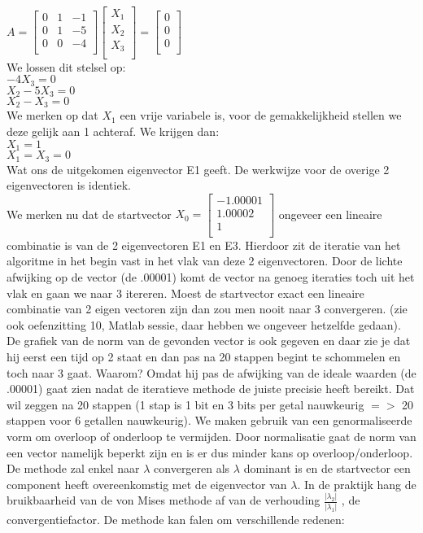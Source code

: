 $ A =\begin{bmatrix} 
 0 & 1 & -1 \\
 0 & 1 & -5 \\
 0 & 0 & -4\\
\end{bmatrix} \begin{bmatrix}
X_1 \\
X_2 \\
X_3 \\
\end{bmatrix} = \begin{bmatrix}
0 \\
0 \\
0 \\
\end{bmatrix} $ \\
We lossen dit stelsel op: \\
$-4X_3 = 0 $ \\
$X_2 - 5X_3 = 0 $ \\
$X_2 - X_3 = 0 $ \\
We merken op dat $X_1$ een vrije variabele is, voor de gemakkelijkheid stellen we deze gelijk aan 1 achteraf.
We krijgen dan: \\
$X_1 = 1 $ \\
$X_1 = X_3 = 0 $ \\
Wat ons de uitgekomen eigenvector E1 geeft. De werkwijze voor de overige 2 eigenvectoren is identiek. \\
We merken nu dat de startvector 
$ X_0 = \begin{bmatrix}
-1.00001 \\
1.00002 \\
1 \\
\end{bmatrix} $
ongeveer een lineaire combinatie is van de 2 eigenvectoren E1 en E3. Hierdoor zit de iteratie van het algoritme in het begin vast in het vlak van deze 2 eigenvectoren. Door de lichte afwijking op de vector (de .00001) komt de vector na genoeg iteraties toch uit het vlak en gaan we naar 3 itereren. Moest de startvector exact een lineaire combinatie van 2 eigen vectoren zijn dan zou men nooit naar 3 convergeren. (zie ook oefenzitting 10, Matlab sessie, daar hebben we ongeveer hetzelfde gedaan). De grafiek van de norm van de gevonden vector is ook gegeven en daar zie je dat hij eerst een tijd op 2 staat en dan pas na 20 stappen begint te schommelen en toch naar 3 gaat. Waarom? Omdat hij pas de afwijking van de ideale waarden (de .00001) gaat zien nadat de iteratieve methode de juiste precisie heeft bereikt. Dat wil zeggen na 20 stappen (1 stap is 1 bit en 3 bits per getal nauwkeurig $=>$ 20 stappen voor 6 getallen nauwkeurig). We maken gebruik van een genormaliseerde vorm om overloop of onderloop te vermijden. Door normalisatie gaat de norm van een vector namelijk beperkt zijn en is er dus minder kans op overloop/onderloop. De methode zal enkel naar $\lambda$ convergeren als $\lambda$ dominant is en de startvector een component heeft overeenkomstig met de eigenvector van $\lambda$. In de praktijk hang de bruikbaarheid van de von Mises methode af van de verhouding $\frac{| \lambda_2 |}{| \lambda_1 |}$ , de convergentiefactor. De methode kan falen om verschillende redenen: \\
